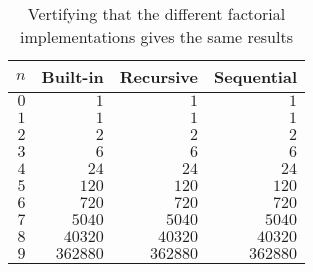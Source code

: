 \begin{table}[ht]
	\begin{center}
	\caption{Vertifying that the different factorial
    implementations gives the same results}
	\label{tab:facV}
		\begin{tabular}{rrrr}
		\toprule
			$n$ & Built-in & Recursive & Sequential\\
			\midrule
			$0$ & $1$ & $1$ & $1$\\
			$1$ & $1$ & $1$ & $1$\\
			$2$ & $2$ & $2$ & $2$\\
			$3$ & $6$ & $6$ & $6$\\
			$4$ & $24$ & $24$ & $24$\\
			$5$ & $120$ & $120$ & $120$\\
			$6$ & $720$ & $720$ & $720$\\
			$7$ & $5040$ & $5040$ & $5040$\\
			$8$ & $40320$ & $40320$ & $40320$\\
			$9$ & $362880$ & $362880$ & $362880$\\
		\bottomrule
		\end{tabular}
	\end{center}
\end{table}
